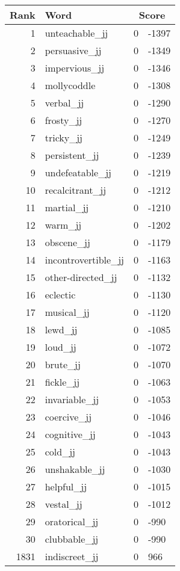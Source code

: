 \begin{longtable}[!htbp]{| rlr@{.}l |}
    \hline
    \textbf{Rank} & \textbf{Word} & \multicolumn{2}{c|}{\textbf{Score}} \\
    \hline
    \endhead
    1 & unteachable\_jj & 0 & -1397 \\
    2 & persuasive\_jj & 0 & -1349 \\
    3 & impervious\_jj & 0 & -1346 \\
    4 & mollycoddle & 0 & -1308 \\
    5 & verbal\_jj & 0 & -1290 \\
    6 & frosty\_jj & 0 & -1270 \\
    7 & tricky\_jj & 0 & -1249 \\
    8 & persistent\_jj & 0 & -1239 \\
    9 & undefeatable\_jj & 0 & -1219 \\
    10 & recalcitrant\_jj & 0 & -1212 \\
    11 & martial\_jj & 0 & -1210 \\
    12 & warm\_jj & 0 & -1202 \\
    13 & obscene\_jj & 0 & -1179 \\
    14 & incontrovertible\_jj & 0 & -1163 \\
    15 & other-directed\_jj & 0 & -1132 \\
    16 & eclectic & 0 & -1130 \\
    17 & musical\_jj & 0 & -1120 \\
    18 & lewd\_jj & 0 & -1085 \\
    19 & loud\_jj & 0 & -1072 \\
    20 & brute\_jj & 0 & -1070 \\
    21 & fickle\_jj & 0 & -1063 \\
    22 & invariable\_jj & 0 & -1053 \\
    23 & coercive\_jj & 0 & -1046 \\
    24 & cognitive\_jj & 0 & -1043 \\
    25 & cold\_jj & 0 & -1043 \\
    26 & unshakable\_jj & 0 & -1030 \\
    27 & helpful\_jj & 0 & -1015 \\
    28 & vestal\_jj & 0 & -1012 \\
    29 & oratorical\_jj & 0 & -990 \\
    30 & clubbable\_jj & 0 & -990 \\
    1831 & indiscreet\_jj & 0 & 966 \\

\end{longtable}
